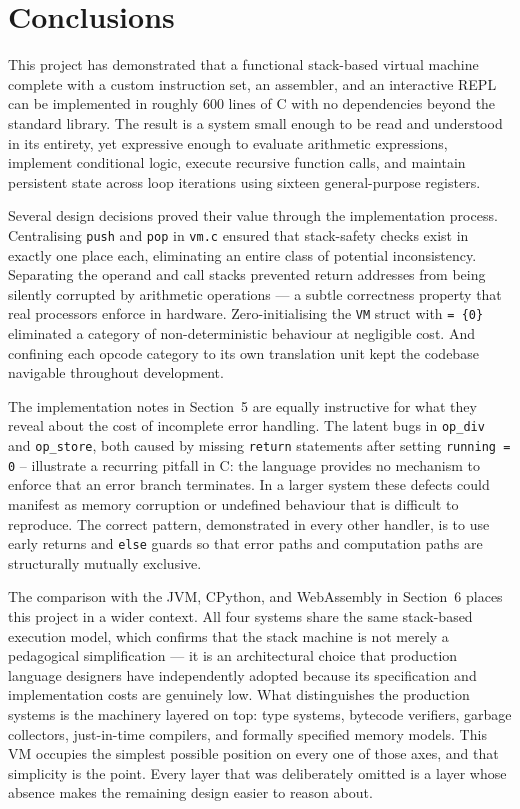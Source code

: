 \section{Conclusions}

This project has demonstrated that a functional stack-based virtual machine 
complete with a custom instruction set, an assembler, and an interactive REPL 
can be implemented in roughly 600 lines of C with no dependencies beyond the 
standard library. The result is a system small enough to be read and understood 
in its entirety, yet expressive enough to evaluate arithmetic expressions, 
implement conditional logic, execute recursive function calls, and maintain 
persistent state across loop iterations using sixteen general-purpose registers.

Several design decisions proved their value through the implementation process. 
Centralising \texttt{push} and \texttt{pop} in \texttt{vm.c} ensured that 
stack-safety checks exist in exactly one place each, eliminating an entire 
class of potential inconsistency. Separating the operand and call stacks 
prevented return addresses from being silently corrupted by arithmetic 
operations — a subtle correctness property that real processors enforce in 
hardware. Zero-initialising the \texttt{VM} struct with \texttt{= \{0\}} 
eliminated a category of non-deterministic behaviour at negligible cost. And 
confining each opcode category to its own translation unit kept the codebase 
navigable throughout development.

The implementation notes in Section~5 are equally instructive for what they 
reveal about the cost of incomplete error handling. The latent bugs in 
\texttt{op\_div} and \texttt{op\_store}, both caused by missing \texttt{return} 
statements after setting \texttt{running = 0} – illustrate a recurring pitfall 
in C: the language provides no mechanism to enforce that an error branch 
terminates. In a larger system these defects could manifest as memory corruption 
or undefined behaviour that is difficult to reproduce. The correct pattern, 
demonstrated in every other handler, is to use early returns and 
\texttt{else} guards so that error paths and computation paths are structurally 
mutually exclusive.

The comparison with the JVM, CPython, and WebAssembly in Section~6 places 
this project in a wider context. All four systems share the same stack-based 
execution model, which confirms that the stack machine is not merely a 
pedagogical simplification — it is an architectural choice that production 
language designers have independently adopted because its specification and 
implementation costs are genuinely low. What distinguishes the production 
systems is the machinery layered on top: type systems, bytecode verifiers, 
garbage collectors, just-in-time compilers, and formally specified memory 
models. This VM occupies the simplest possible position on every one of those 
axes, and that simplicity is the point. Every layer that was deliberately 
omitted is a layer whose absence makes the remaining design easier to reason 
about.

